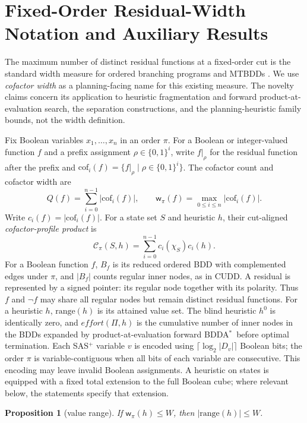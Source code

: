 \documentclass[letterpaper]{article}
\newcommand{\task}{\ensuremath{\Pi}}
\newcommand{\hblind}{\ensuremath{h^{0}}}
\newcommand{\bdd}[1]{\ensuremath{B_{#1}}}
\newcommand{\bddsize}[1]{\ensuremath{|B_{#1}|}}
\newcommand{\cofcount}{\ensuremath{Q}}
\newcommand{\width}{\ensuremath{\mathsf{w}}}
\newcommand{\cutcount}[2]{\ensuremath{c_{#1}(#2)}}
\newcommand{\cutprod}[2]{\ensuremath{\mathcal{C}_{\pi}(#1,#2)}}
\newcommand{\effort}{\ensuremath{\mathit{effort}}}
\newcommand{\sub}[2]{\ensuremath{\mathrm{cof}_{#1}(#2)}}
\newcommand{\hrange}{\ensuremath{\mathrm{range}}}
\newcommand{\bddastar}{BDDA\ensuremath{^{*}}}
\theoremstyle{plain}
\newtheorem{proposition}{Proposition}
\theoremstyle{definition}
\theoremstyle{remark}
\begin{document}
\section{Fixed-Order Residual-Width Notation and Auxiliary Results}

The maximum number of distinct residual functions at a fixed-order cut is the
standard width measure for ordered branching programs and MTBDDs
\citep[Thm.~3.2.2; Sec.~9.2]{wegener-2000}. We use
\emph{cofactor width} as a planning-facing name for this existing measure.
The novelty claims concern its application to heuristic fragmentation and
forward product-at-evaluation search, the separation constructions, and the
planning-heuristic family bounds, not the width definition.

Fix Boolean variables $x_1,\dots,x_n$ in an order $\pi$.  For a Boolean
or integer-valued function $f$ and a prefix assignment
$\rho\in\{0,1\}^i$, write $f|_\rho$ for the residual function after the
prefix and
$\sub{i}{f}=\{f|_\rho\mid\rho\in\{0,1\}^i\}$.  The cofactor count and
cofactor width are
\[
  \cofcount(f)=\sum_{i=0}^{n-1}|\sub{i}{f}|,
  \qquad
  \width_\pi(f)=\max_{0\leq i\leq n}|\sub{i}{f}|.
\]
Write $\cutcount{i}{f}=|\sub{i}{f}|$. For a state set $S$ and heuristic
$h$, their cut-aligned \emph{cofactor-profile product} is
\[
  \cutprod{S}{h}=\sum_{i=0}^{n-1}
  \cutcount{i}{\chi_S}\cutcount{i}{h}.
\]
For a Boolean function $f$, $\bdd{f}$ is its reduced ordered BDD with
complemented edges under $\pi$, and $\bddsize{f}$ counts regular inner
nodes, as in CUDD. A residual is represented by a signed pointer: its regular
node together with its polarity. Thus $f$ and $\neg f$ may share all regular
nodes but remain distinct residual functions. For a heuristic $h$,
$\hrange(h)$ is its attained value set.  The blind heuristic $\hblind$ is
identically zero, and $\effort(\task,h)$ is the cumulative number of inner
nodes in the BDDs expanded by product-at-evaluation forward \bddastar\ before
optimal termination.
Each SAS$^+$ variable $v$ is encoded using
$\lceil\log_2|D_v|\rceil$ Boolean bits; the order $\pi$ is
variable-contiguous when all bits of each variable are consecutive. This
encoding may leave invalid Boolean assignments. A heuristic on states is
equipped with a fixed total extension to the full Boolean cube; where
relevant below, the statements specify that extension.

\begin{proposition}[value range]
\label{prop-range}
If $\width_\pi(h) \leq W$, then $|\hrange(h)| \leq W$.
\end{proposition}
\end{document}
